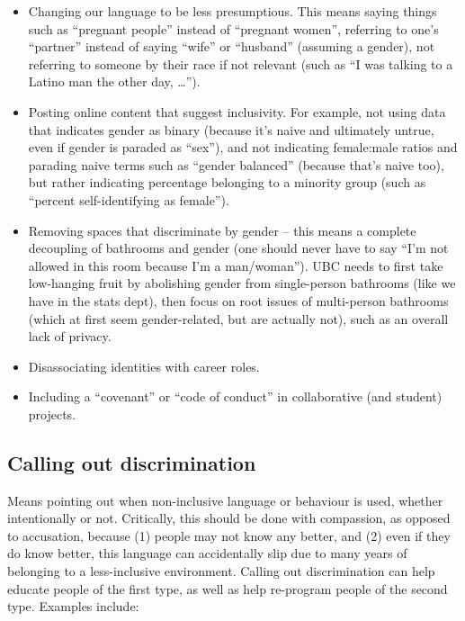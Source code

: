 \documentclass[]{book}
\providecommand{\tightlist}{%
  \setlength{\itemsep}{0pt}\setlength{\parskip}{0pt}}
\begin{document}
\begin{itemize}
\tightlist
\item
  Changing our language to be less presumptious. This means saying things such as ``pregnant people'' instead of ``pregnant women'', referring to one's ``partner'' instead of saying ``wife'' or ``husband'' (assuming a gender), not referring to someone by their race if not relevant (such as ``I was talking to a Latino man the other day, \ldots{}'').
\item
  Posting online content that suggest inclusivity. For example, not using data that indicates gender as binary (because it's naive and ultimately untrue, even if gender is paraded as ``sex''), and not indicating female:male ratios and parading naive terms such as ``gender balanced'' (because that's naive too), but rather indicating percentage belonging to a minority group (such as ``percent self-identifying as female'').
\item
  Removing spaces that discriminate by gender -- this means a complete decoupling of bathrooms and gender (one should never have to say ``I'm not allowed in this room because I'm a man/woman''). UBC needs to first take low-hanging fruit by abolishing gender from single-person bathrooms (like we have in the stats dept), then focus on root issues of multi-person bathrooms (which at first seem gender-related, but are actually not), such as an overall lack of privacy.
\item
  Disassociating identities with career roles.
\item
  Including a ``covenant'' or ``code of conduct'' in collaborative (and student) projects.
\end{itemize}

\hypertarget{calling-out-discrimination}{%
\subsection{Calling out discrimination}\label{calling-out-discrimination}}

Means pointing out when non-inclusive language or behaviour is used, whether intentionally or not. Critically, this should be done with compassion, as opposed to accusation, because (1) people may not know any better, and (2) even if they do know better, this language can accidentally slip due to many years of belonging to a less-inclusive environment. Calling out discrimination can help educate people of the first type, as well as help re-program people of the second type. Examples include:
\end{document}
